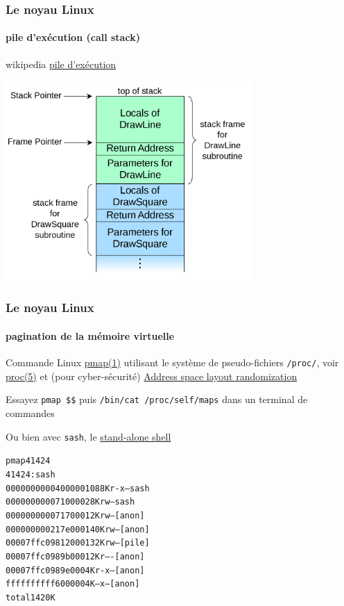 \documentclass[xcolor=svgnames,final,smaller,a4]{beamer}
\begin{document}
\begin{frame}
  \frametitle{Le noyau Linux}
  \framesubtitle{pile d'exécution (call stack)}
  wikipedia \href{https://fr.wikipedia.org/wiki/Pile_d'exécution}{pile d'exécution}

  \includegraphics[width=0.7\textwidth]{call-stack}
  
\end{frame}


\begin{frame}
  \frametitle{Le noyau Linux}
  \framesubtitle{pagination de la mémoire virtuelle}

  Commande Linux
  \href{https://man7.org/linux/man-pages/man1/pmap.1.html}{pmap(1)}
  utilisant le système de pseudo-fichiers \texttt{/proc/}, voir
  \href{https://man7.org/linux/man-pages/man5/proc.5.html}{proc(5)} et (pour cyber-sécurité) \href{https://fr.wikipedia.org/wiki/Address_space_layout_randomization}{Address space layout randomization}

  Essayez \texttt{pmap \$\$} puis \texttt{/bin/cat /proc/self/maps} dans un terminal de commandes

  Ou bien avec \texttt{sash}, le \href{https://en.wikipedia.org/wiki/Stand-alone_shell}{stand-alone shell}

      \begin{alltt}
    pmap 41424\\
    41424:   sash\\
    0000000000400000   1088K r-x-- sash\\
    0000000000710000     28K rw--- sash\\
    0000000000717000     12K rw---   [ anon ]\\
    000000000217e000    140K rw---   [ anon ]\\
    00007ffc09812000    132K rw---   [ pile  ]\\
    00007ffc0989b000     12K r----   [ anon ]\\
    00007ffc0989e000      4K r-x--   [ anon ]\\
    ffffffffff600000      4K --x--   [ anon ]\\
     total             1420K
      \end{alltt}
  
\end{frame}
\end{document}
